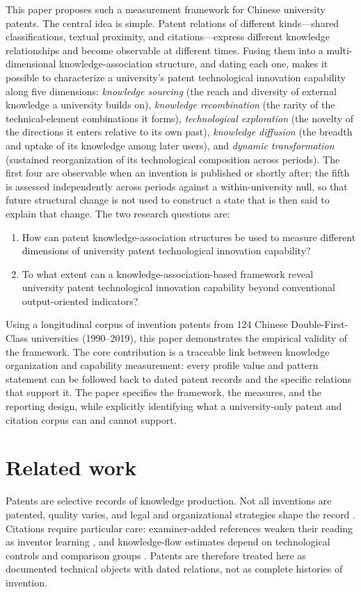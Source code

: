This paper proposes such a measurement framework for Chinese university
patents. The central idea is simple. Patent relations of different
kinds---shared classifications, textual proximity, and citations---express
different knowledge relationships and become observable at different times.
Fusing them into a multi-dimensional knowledge-association structure, and
dating each one, makes it possible to characterize a university's patent
technological innovation capability along five dimensions: \emph{knowledge
sourcing} (the reach and diversity of external knowledge a university builds
on), \emph{knowledge recombination} (the rarity of the technical-element
combinations it forms), \emph{technological exploration} (the novelty of the
directions it enters relative to its own past), \emph{knowledge diffusion}
(the breadth and uptake of its knowledge among later users), and
\emph{dynamic transformation} (sustained reorganization of its technological
composition across periods). The first four are observable when an invention
is published or shortly after; the fifth is assessed independently across
periods against a within-university null, so that future structural change is
not used to construct a state that is then said to explain that change. The
two research questions are:
\begin{enumerate}[label=\textbf{RQ\arabic*.}]
\item How can patent knowledge-association structures be used to measure
different dimensions of university patent technological innovation
capability?
\item To what extent can a knowledge-association-based framework reveal
university patent technological innovation capability beyond conventional
output-oriented indicators?
\end{enumerate}

Using a longitudinal corpus of invention patents from 124 Chinese
Double-First-Class universities (1990--2019), this paper demonstrates the
empirical validity of the framework. The core contribution is a traceable
link between knowledge organization and capability measurement: every
profile value and pattern statement can be followed back to dated patent
records and the specific relations that support it. The paper specifies the
framework, the measures, and the reporting design, while explicitly
identifying what a university-only patent and citation corpus can and cannot
support.

\section{Related work}\label{sec:related}
Patents are selective records of knowledge production. Not all inventions are
patented, quality varies, and legal and organizational strategies shape the
record \citep{griliches1990,nagaoka2010}. Citations require particular care:
examiner-added references weaken their reading as inventor learning
\citep{alcacer2006}, and knowledge-flow estimates depend on technological
controls and comparison groups \citep{jaffe1993,thompson2005}. Patents are
therefore treated here as documented technical objects with dated relations,
not as complete histories of invention.

